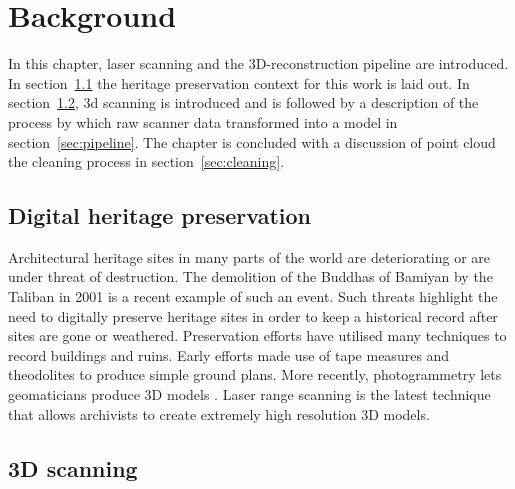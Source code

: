 \chapter{Background} \label{ch:background}


In this chapter, laser scanning and the 3D-reconstruction pipeline are introduced. In section~\ref{sec:heritage} the heritage preservation context for this work is laid out. In section~\ref{sec:scanners}, 3d scanning is introduced and is followed by a description of the process by which raw scanner data transformed into a model in section~\ref{sec:pipeline}. The chapter is concluded with a discussion of point cloud the cleaning process in section~\ref{sec:cleaning}.


\section{Digital heritage preservation} \label{sec:heritage}

Architectural heritage sites in many parts of the world are deteriorating or are under threat of destruction. The demolition of the Buddhas of Bamiyan by the Taliban in 2001 \cite{Toubekis2009} is a recent example of such an event. Such threats highlight the need to digitally preserve heritage sites in order to keep a historical record after sites are gone or weathered. Preservation efforts have utilised many techniques to record buildings and ruins. Early efforts made use of tape measures and theodolites to produce simple ground plans. More recently, photogrammetry lets geomaticians produce 3D models \cite{Heritage}. Laser range scanning is the latest technique that allows archivists to create extremely high resolution 3D models.




\section{3D scanning} \label{sec:scanners}

